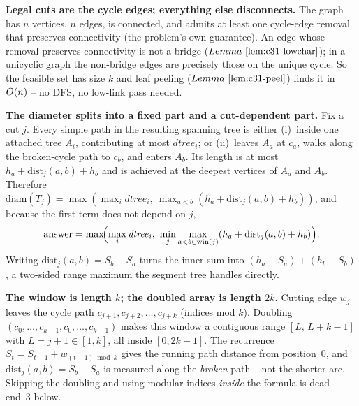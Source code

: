 \begin{observation}
\textbf{Legal cuts are the cycle edges; everything else disconnects.}
The graph has \(n\) vertices, \(n\) edges, is connected, and admits at least one
cycle-edge removal that preserves connectivity (the problem's own guarantee).
An edge whose removal preserves connectivity is not a bridge
(\(\lemref{c31-lowchar}\)); in a unicyclic graph the non-bridge edges are precisely
those on the unique cycle.  So the feasible set has size \(k\) and leaf peeling
(\(\lemref{c31-peel}\)) finds it in \(O(n)\) -- no DFS, no low-link pass needed.
\end{observation}
\begin{observation}
\textbf{The diameter splits into a fixed part and a cut-dependent part.}
Fix a cut \(j\).  Every simple path in the resulting spanning tree is either
(i)~inside one attached tree \(A_i\), contributing at most \(\mathit{dtree}_i\); or
(ii)~leaves \(A_a\) at \(c_a\), walks along the broken-cycle path to \(c_b\), and
enters \(A_b\).  Its length is at most \(h_a+\mathrm{dist}_j(a,b)+h_b\) and is
achieved at the deepest vertices of \(A_a\) and \(A_b\).  Therefore
\(\mathrm{diam}(T_j)=\max(\max_i\mathit{dtree}_i,\ \max_{a<b}(h_a+\mathrm{dist}_j(a,b)+h_b))\),
and because the first term does not depend on \(j\),
\[
\text{answer}=\max\!\Bigl(\max_i\mathit{dtree}_i,\ \min_j\max_{a<b\in\mathrm{win}(j)}(h_a+\mathrm{dist}_j(a,b)+h_b)\Bigr).
\]
Writing \(\mathrm{dist}_j(a,b)=S_b-S_a\) turns the inner sum into
\((h_a-S_a)+(h_b+S_b)\), a two-sided range maximum the segment tree handles directly.
\end{observation}
\begin{observation}
\textbf{The window is length \(k\); the doubled array is length \(2k\).}
Cutting edge \(w_j\) leaves the cycle path \(c_{j+1},c_{j+2},\ldots,c_{j+k}\) (indices
mod \(k\)).  Doubling \((c_0,\ldots,c_{k-1},c_0,\ldots,c_{k-1})\) makes this window a
contiguous range \([L,\,L{+}k{-}1]\) with \(L=j+1\in[1,k]\), all inside \([0,2k{-}1]\).
The recurrence \(S_t=S_{t-1}+w_{(t-1)\bmod k}\) gives the running path distance
from position~0, and \(\mathrm{dist}_j(a,b)=S_b-S_a\) is measured along the \emph{broken}
path -- not the shorter arc.  Skipping the doubling and using modular indices
\emph{inside} the formula is dead end~3 below.
\end{observation}


